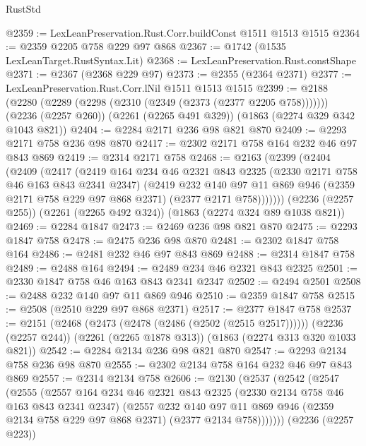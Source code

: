 \begin{lexlean}{RustStd}
\begin{coremodule}
@2359 := LexLeanPreservation.Rust.Corr.buildConst @1511 @1513 @1515
@2364 := @2359 @2205 @758 @229 @97 @868
@2367 := @1742 (@1535 LexLeanTarget.RustSyntax.Lit)
@2368 := LexLeanPreservation.Rust.constShape
@2371 := @2367 (@2368 @229 @97)
@2373 := @2355 (@2364 @2371)
@2377 := LexLeanPreservation.Rust.Corr.lNil @1511 @1513 @1515
@2399 := @2188
    (@2280 (@2289 (@2298 (@2310 (@2349 (@2373 (@2377 @2205 @758)))))))
    (@2236 (@2257 @260))
    (@2261 (@2265 @491 @329))
    (@1863 (@2274 @329 @342 @1043 @821))
@2404 := @2284 @2171 @236 @98 @821 @870
@2409 := @2293 @2171 @758 @236 @98 @870
@2417 := @2302 @2171 @758 @164 @232 @46 @97 @843 @869
@2419 := @2314 @2171 @758
@2468 := @2163
    (@2399
      (@2404
        (@2409
          (@2417
            (@2419
              @164
              @234
              @46
              @2321
              @843
              @2325
              (@2330 @2171 @758 @46 @163 @843 @2341 @2347)
              (@2419
                @232
                @140
                @97
                @11
                @869
                @946
                (@2359 @2171 @758 @229 @97 @868 @2371)
                (@2377 @2171 @758)))))))
    (@2236 (@2257 @255))
    (@2261 (@2265 @492 @324))
    (@1863 (@2274 @324 @89 @1038 @821))
@2469 := @2284 @1847
@2473 := @2469 @236 @98 @821 @870
@2475 := @2293 @1847 @758
@2478 := @2475 @236 @98 @870
@2481 := @2302 @1847 @758 @164
@2486 := @2481 @232 @46 @97 @843 @869
@2488 := @2314 @1847 @758
@2489 := @2488 @164
@2494 := @2489 @234 @46 @2321 @843 @2325
@2501 := @2330 @1847 @758 @46 @163 @843 @2341 @2347
@2502 := @2494 @2501
@2508 := @2488 @232 @140 @97 @11 @869 @946
@2510 := @2359 @1847 @758
@2515 := @2508 (@2510 @229 @97 @868 @2371)
@2517 := @2377 @1847 @758
@2537 := @2151
    (@2468 (@2473 (@2478 (@2486 (@2502 (@2515 @2517))))))
    (@2236 (@2257 @244))
    (@2261 (@2265 @1878 @313))
    (@1863 (@2274 @313 @320 @1033 @821))
@2542 := @2284 @2134 @236 @98 @821 @870
@2547 := @2293 @2134 @758 @236 @98 @870
@2555 := @2302 @2134 @758 @164 @232 @46 @97 @843 @869
@2557 := @2314 @2134 @758
@2606 := @2130
    (@2537
      (@2542
        (@2547
          (@2555
            (@2557
              @164
              @234
              @46
              @2321
              @843
              @2325
              (@2330 @2134 @758 @46 @163 @843 @2341 @2347)
              (@2557
                @232
                @140
                @97
                @11
                @869
                @946
                (@2359 @2134 @758 @229 @97 @868 @2371)
                (@2377 @2134 @758)))))))
    (@2236 (@2257 @223))

\end{coremodule}
\end{lexlean}
